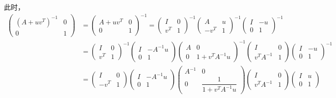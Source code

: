 此时，
\begin{align*}
\begin{pmatrix} (A + uv^T)^{-1} & 0 \\ 0 & 1 \end{pmatrix} & = \begin{pmatrix} A + uv^T & 0 \\ 0 & 1 \end{pmatrix}^{-1} = \begin{pmatrix} I & 0 \\ v^T & 1 \end{pmatrix}^{-1} \begin{pmatrix} A & u \\ -v^T & 1 \end{pmatrix}^{-1} \begin{pmatrix} I & -u \\ 0 & 1 \end{pmatrix}^{-1} \\
& = \begin{pmatrix} I & 0 \\ v^T & 1 \end{pmatrix}^{-1} \begin{pmatrix} I & -A^{-1}u \\ 0 & 1 \end{pmatrix} \begin{pmatrix} A & 0 \\ 0 & 1 + v^TA^{-1}u \end{pmatrix}^{-1} \begin{pmatrix} I & 0 \\ v^TA^{-1} & 1 \end{pmatrix} \begin{pmatrix} I & -u \\ 0 & 1 \end{pmatrix}^{-1} \\
& = \begin{pmatrix} I & 0 \\ -v^T & 1 \end{pmatrix} \begin{pmatrix} I & -A^{-1}u \\ 0 & 1 \end{pmatrix} \begin{pmatrix} A^{-1} & 0 \\ 0 & \dfrac{1}{1 + v^TA^{-1}u} \end{pmatrix} \begin{pmatrix} I & 0 \\ v^TA^{-1} & 1 \end{pmatrix} \begin{pmatrix} I & u \\ 0 & 1 \end{pmatrix} \\

\end{align*}
